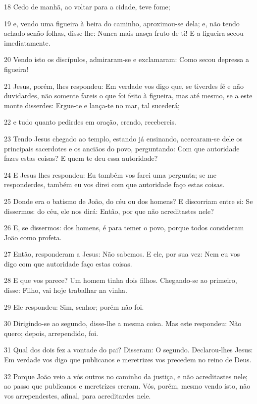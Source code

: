 \par 18 Cedo de manhã, ao voltar para a cidade, teve fome;
\par 19 e, vendo uma figueira à beira do caminho, aproximou-se dela; e, não tendo achado senão folhas, disse-lhe: Nunca mais nasça fruto de ti! E a figueira secou imediatamente.
\par 20 Vendo isto os discípulos, admiraram-se e exclamaram: Como secou depressa a figueira!
\par 21 Jesus, porém, lhes respondeu: Em verdade vos digo que, se tiverdes fé e não duvidardes, não somente fareis o que foi feito à figueira, mas até mesmo, se a este monte disserdes: Ergue-te e lança-te no mar, tal sucederá;
\par 22 e tudo quanto pedirdes em oração, crendo, recebereis.
\par 23 Tendo Jesus chegado ao templo, estando já ensinando, acercaram-se dele os principais sacerdotes e os anciãos do povo, perguntando: Com que autoridade fazes estas coisas? E quem te deu essa autoridade?
\par 24 E Jesus lhes respondeu: Eu também vos farei uma pergunta; se me responderdes, também eu vos direi com que autoridade faço estas coisas.
\par 25 Donde era o batismo de João, do céu ou dos homens? E discorriam entre si: Se dissermos: do céu, ele nos dirá: Então, por que não acreditastes nele?
\par 26 E, se dissermos: dos homens, é para temer o povo, porque todos consideram João como profeta.
\par 27 Então, responderam a Jesus: Não sabemos. E ele, por sua vez: Nem eu vos digo com que autoridade faço estas coisas.
\par 28 E que vos parece? Um homem tinha dois filhos. Chegando-se ao primeiro, disse: Filho, vai hoje trabalhar na vinha.
\par 29 Ele respondeu: Sim, senhor; porém não foi.
\par 30 Dirigindo-se ao segundo, disse-lhe a mesma coisa. Mas este respondeu: Não quero; depois, arrependido, foi.
\par 31 Qual dos dois fez a vontade do pai? Disseram: O segundo. Declarou-lhes Jesus: Em verdade vos digo que publicanos e meretrizes vos precedem no reino de Deus.
\par 32 Porque João veio a vós outros no caminho da justiça, e não acreditastes nele; ao passo que publicanos e meretrizes creram. Vós, porém, mesmo vendo isto, não vos arrependestes, afinal, para acreditardes nele.
